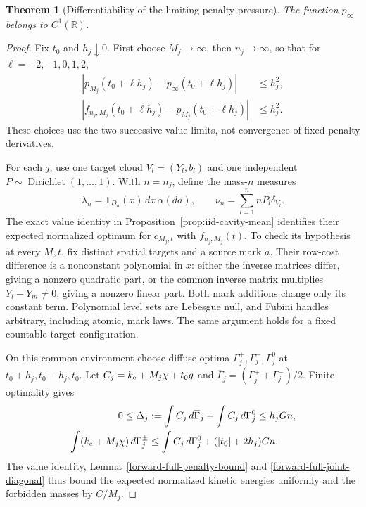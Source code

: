 \documentclass[11pt,reqno]{amsart}
\newtheorem{theorem}{Theorem}[section]
\theoremstyle{definition}
\theoremstyle{remark}
\numberwithin{equation}{section}
\newcommand{\R}{\mathbb R}
\begin{document}
\begin{theorem}[Differentiability of the limiting penalty pressure]
\label{forward-full-pressure-c1}
The function \(p_\infty\) belongs to \(C^1(\R)\).
\end{theorem}
\begin{proof}
Fix \(t_0\) and \(h_j\downarrow0\). First choose \(M_j\to\infty\),
then \(n_j\to\infty\), so that for \(\ell=-2,-1,0,1,2\),
\begin{equation}
\label{forward-full-joint-diagonal}
 \begin{split}
 |p_{M_j}(t_0+\ell h_j)-p_\infty(t_0+\ell h_j)|&\le h_j^2,\\
 |f_{n_j,M_j}(t_0+\ell h_j)-p_{M_j}(t_0+\ell h_j)|&\le h_j^2.
 \end{split}
\end{equation}
These choices use the two successive value limits, not convergence of
fixed-penalty derivatives.

For each \(j\), use one target cloud \(V_l=(Y_l,b_l)\) and one
independent \(P\sim\operatorname{Dirichlet}(1,\ldots,1)\). With
\(n=n_j\), define the mass-\(n\) measures
\[
 \lambda_n=\mathbf1_{D_n}(x)\,dx\,\alpha(da),\qquad
 \nu_n=\sum_{l=1}^n nP_l\delta_{V_l}.
\]
The exact value identity in Proposition~\ref{prop:iid-cavity-mean}
identifies their expected normalized optimum for \(c_{M_j,t}\) with
\(f_{n_j,M_j}(t)\). To check its hypothesis at every \(M,t\), fix
distinct spatial targets and a source mark \(a\). Their row-cost
difference is a nonconstant polynomial in \(x\): either the inverse
matrices differ, giving a nonzero quadratic part, or the common inverse
matrix multiplies \(Y_l-Y_m\ne0\), giving a nonzero linear part.
Both mark additions change only its constant term. Polynomial level sets
are Lebesgue null, and Fubini handles arbitrary, including atomic, mark
laws. The same argument holds for a fixed countable target configuration.

On this common environment choose diffuse optima
\(\Gamma_j^+,\Gamma_j^-,\Gamma_j^0\) at
\(t_0+h_j,t_0-h_j,t_0\). Let
\(C_j=k_{\rm e}+M_j\chi+t_0g\) and
\(\overline\Gamma_j=(\Gamma_j^++\Gamma_j^-)/2\).
Finite optimality gives
\begin{equation}
\label{forward-full-diffuse-excess}
 \begin{split}
 0\le\Delta_j
  &:=\int C_j\,d\overline\Gamma_j-\int C_j\,d\Gamma_j^0
       \le h_jGn,\\
 \int(k_{\rm e}+M_j\chi)\,d\Gamma_j^\pm
  &\le\int C_j\,d\Gamma_j^0+(|t_0|+2h_j)Gn.
 \end{split}
\end{equation}
The value identity, Lemma~\ref{forward-full-penalty-bound} and
\eqref{forward-full-joint-diagonal} thus bound the expected normalized
kinetic energies uniformly and the forbidden masses by \(C/M_j\).


\end{proof}
\end{document}
